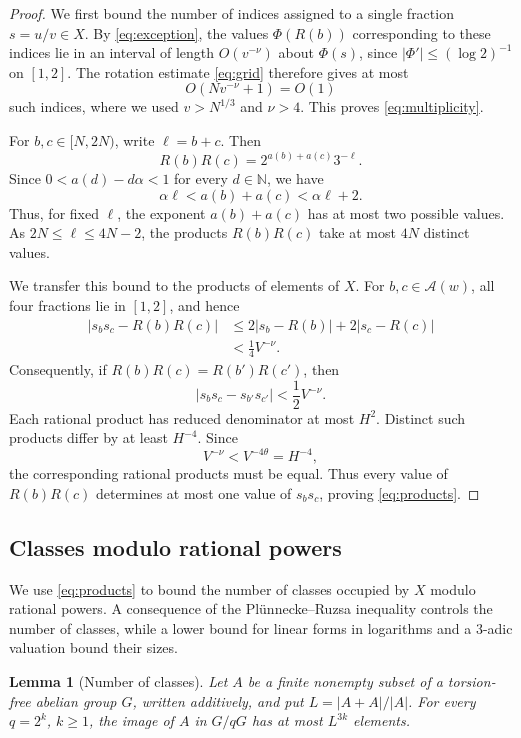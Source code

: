 \documentclass[11pt,reqno]{amsart}
\newtheorem{lemma}{Lemma}[section]
\theoremstyle{definition}
\newcommand{\N}{\mathbb N}
\begin{document}
\begin{proof}
We first bound the number of indices assigned to a
single fraction $s=u/v\in X$. By
\eqref{eq:exception}, the values $\Phi(R(b))$
corresponding to these indices lie in an interval
of length $O(v^{-\nu})$ about $\Phi(s)$, since
$|\Phi'|\le(\log2)^{-1}$ on $[1,2]$.
The rotation estimate \eqref{eq:grid} therefore
gives at most
\[
 O(Nv^{-\nu}+1)=O(1)
\]
such indices, where we used $v>N^{1/3}$ and
$\nu>4$. This proves \eqref{eq:multiplicity}.

For $b,c\in[N,2N)$, write $\ell=b+c$. Then
\[
 R(b)R(c)=2^{a(b)+a(c)}3^{-\ell}.
\]
Since $0<a(d)-d\alpha<1$ for every $d\in\N$,
we have
\[
 \alpha\ell<a(b)+a(c)<\alpha\ell+2.
\]
Thus, for fixed $\ell$, the exponent $a(b)+a(c)$
has at most two possible values. As
$2N\le\ell\le4N-2$, the products $R(b)R(c)$
take at most $4N$ distinct values.

We transfer this bound to the products of elements
of $X$. For $b,c\in\mathcal A(w)$, all four
fractions lie in $[1,2]$, and hence
\[
 \begin{aligned}
 |s_bs_c-R(b)R(c)|
 &\le2|s_b-R(b)|+2|s_c-R(c)|\\
 &<\frac14V^{-\nu}.
 \end{aligned}
\]
Consequently, if
$R(b)R(c)=R(b')R(c')$, then
\[
 |s_bs_c-s_{b'}s_{c'}|<\frac12V^{-\nu}.
\]
Each rational product has reduced denominator at
most $H^2$. Distinct such products differ by at
least $H^{-4}$. Since
\[
 V^{-\nu}<V^{-4\theta}=H^{-4},
\]
the corresponding rational products must be equal.
Thus every value of $R(b)R(c)$ determines at most
one value of $s_bs_c$, proving \eqref{eq:products}.
\end{proof}

\subsection{Classes modulo rational powers}

We use \eqref{eq:products} to bound the number of
classes occupied by $X$ modulo rational powers.
A consequence of the Pl\"unnecke--Ruzsa inequality
controls the number of classes, while a lower bound
for linear forms in logarithms and a $3$-adic
valuation bound their sizes.

\begin{lemma}[Number of classes]\label{lem:classes}
Let $A$ be a finite nonempty subset of a torsion-free
abelian group $G$, written additively, and put
$L=|A+A|/|A|$. For every $q=2^k$, $k\ge1$,
the image of $A$ in $G/qG$ has at most $L^{3k}$
elements.
\end{lemma}
\end{document}
